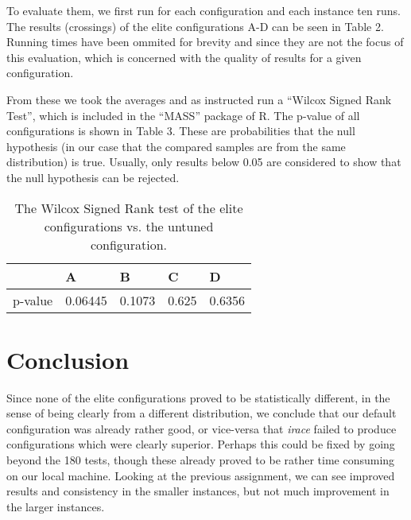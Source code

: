 \documentclass [11pt]{article}
\begin{document}
To evaluate them, we first run for each configuration and each instance ten runs. The results (crossings) of the elite configurations A-D can be seen in Table 2. Running times have been ommited for brevity and since they are not the focus of this evaluation, which is concerned with the quality of results for a given configuration.
 
From these we took the averages and as instructed run a ``Wilcox Signed Rank Test'', which is included in the ``MASS'' package of R. The p-value of all configurations is shown in Table 3. These are probabilities that the null hypothesis (in our case that the compared samples are from the same distribution) is true. Usually, only results below 0.05 are considered to show that the null hypothesis can be rejected. 

\begin{table}[]
\centering
\caption{The Wilcox Signed Rank test of the elite configurations vs. the untuned configuration.}
\label{my-label}
\begin{tabular}{|l|l|l|l|l|}
\hline
        & A       & B      & C     & D      \\ \hline
p-value & 0.06445 & 0.1073 & 0.625 & 0.6356 \\ \hline
\end{tabular}
\end{table} 

\section{Conclusion}
Since none of the elite configurations proved to be statistically different, in the sense of being clearly from a different distribution, we conclude that our default configuration was already rather good, or vice-versa that \emph{irace} failed to produce configurations which were clearly superior. Perhaps this could be fixed by going beyond the 180 tests, though these already proved to be rather time consuming on our local machine. Looking at the previous assignment, we can see improved results and consistency in the smaller instances, but not much improvement in the larger instances.
\end{document}
